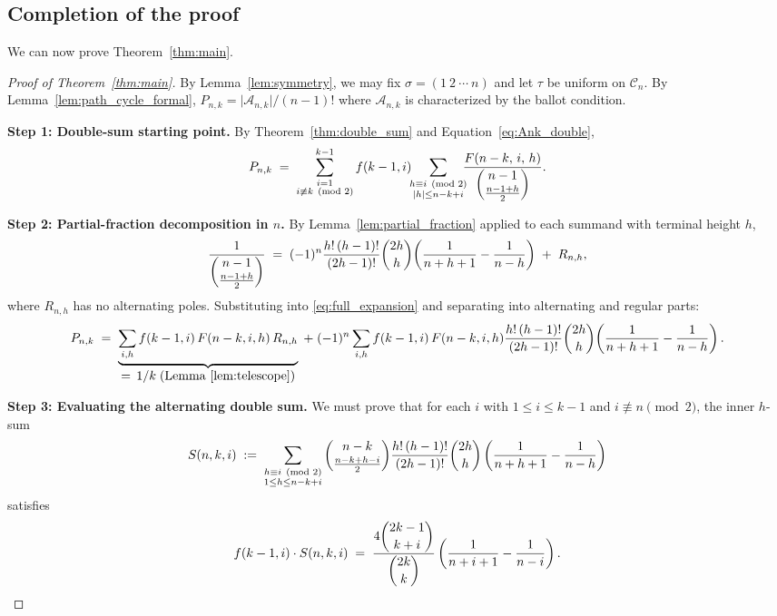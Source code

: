 \documentclass[12pt,a4paper]{article}
\theoremstyle{definition}
\newcommand{\Cn}{\mathcal{C}_n}
\renewcommand{\binom}[2]{\dbinom{#1}{#2}}
\newcommand{\abs}[1]{\lvert #1 \rvert}
\begin{document}
\subsection{Completion of the proof}

We can now prove Theorem~\ref{thm:main}.

\begin{proof}[Proof of Theorem~\ref{thm:main}]
By Lemma~\ref{lem:symmetry}, we may fix $\sigma=(1\ 2\ \cdots\ n)$ and
let $\tau$ be uniform on $\Cn$.  By Lemma~\ref{lem:path_cycle_formal},
$P_{n,k}=\abs{\mathcal{A}_{n,k}}/(n-1)!$ where $\mathcal{A}_{n,k}$
is characterized by the ballot condition.

\textbf{Step 1: Double-sum starting point.}
By Theorem~\ref{thm:double_sum} and Equation~\eqref{eq:Ank_double},
\begin{equation}
\label{eq:full_expansion}
P_{n,k}
\;=\;
\sum_{\substack{i=1\\i\not\equiv k\pmod{2}}}^{k-1}
f(k-1,i)
\!\!
\sum_{\substack{h\equiv i\pmod{2}\\
               \abs{h}\le n-k+i}}
\!\!\!
\frac{F(n-k,\,i,\,h)}{\dbinom{n-1}{\frac{n-1+h}{2}}}.
\end{equation}

\textbf{Step 2: Partial-fraction decomposition in $n$.}
By Lemma~\ref{lem:partial_fraction} applied to each summand with
terminal height $h$,
\[
\frac{1}{\dbinom{n-1}{\frac{n-1+h}{2}}}
\;=\;
(-1)^n
\frac{h!\,(h-1)!}{(2h-1)!}
\binom{2h}{h}
\!\left(\frac{1}{n+h+1}-\frac{1}{n-h}\right)
\;+\; R_{n,h},
\]
where $R_{n,h}$ has no alternating poles.
Substituting into \eqref{eq:full_expansion} and separating into
alternating and regular parts:
\[
P_{n,k}
\;=\;
\underbrace{
  \sum_{i,h}f(k-1,i)\,F(n-k,i,h)\,R_{n,h}
}_{\displaystyle =\,1/k\;(\text{Lemma~\ref{lem:telescope}})}
\;+\;
(-1)^n
\sum_{i,h}
f(k-1,i)\,F(n-k,i,h)
\frac{h!\,(h-1)!}{(2h-1)!}
\binom{2h}{h}
\!\left(\frac{1}{n+h+1}-\frac{1}{n-h}\right).
\]

\textbf{Step 3: Evaluating the alternating double sum.}
We must prove that for each $i$ with $1 \le i \le k-1$ and
$i \not\equiv n \pmod{2}$, the inner $h$-sum
\begin{equation}
\label{eq:inner_h_sum}
S(n,k,i)
\;:=\;
\sum_{\substack{h \equiv i \pmod{2} \\ 1 \le h \le n-k+i}}
\binom{n-k}{\tfrac{n-k+h-i}{2}}
\frac{h!\,(h-1)!}{(2h-1)!}\binom{2h}{h}
\left(\frac{1}{n+h+1}-\frac{1}{n-h}\right)
\end{equation}
satisfies
\[
f(k-1,i)\cdot S(n,k,i)
\;=\;
\frac{4\binom{2k-1}{k+i}}{\binom{2k}{k}}
\left(\frac{1}{n+i+1}-\frac{1}{n-i}\right).
\]


\end{proof}
\end{document}
